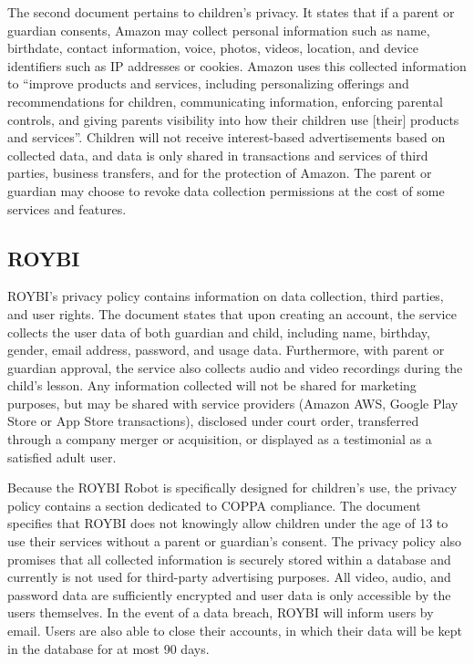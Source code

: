 \documentclass[12pt]{ucthesis}
\begin{document}
The second document pertains to children's privacy. It states that if a parent or guardian consents, Amazon may collect personal information such as name, birthdate, contact information, voice, photos, videos, location, and device identifiers such as IP addresses or cookies. Amazon uses this collected information to ``improve products and services, including personalizing offerings and recommendations for children, communicating information, enforcing parental controls, and giving parents visibility into how their children use [their] products and services''. Children will not receive interest-based advertisements based on collected data, and data is only shared in transactions and services of third parties, business transfers, and for the protection of Amazon. The parent or guardian may choose to revoke data collection permissions at the cost of some services and features.

\subsection{ROYBI}
ROYBI's privacy policy contains information on data collection, third parties, and user rights. The document states that upon creating an account, the service collects the user data of both guardian and child, including name, birthday, gender, email address, password, and usage data. Furthermore, with parent or guardian approval, the service also collects audio and video recordings during the child's lesson. Any information collected will not be shared for marketing purposes, but may be shared with service providers (Amazon AWS, Google Play Store or App Store transactions), disclosed under court order, transferred through a company merger or acquisition, or displayed as a testimonial as a satisfied adult user. 

Because the ROYBI Robot is specifically designed for children's use, the privacy policy contains a section dedicated to COPPA compliance. The document specifies that ROYBI does not knowingly allow children under the age of 13 to use their services without a parent or guardian's consent. The privacy policy also promises that all collected information is securely stored within a database and currently is not used for third-party advertising purposes. All video, audio, and password data are sufficiently encrypted and user data is only accessible by the users themselves. In the event of a data breach, ROYBI will inform users by email. Users are also able to close their accounts, in which their data will be kept in the database for at most 90 days.
\end{document}
